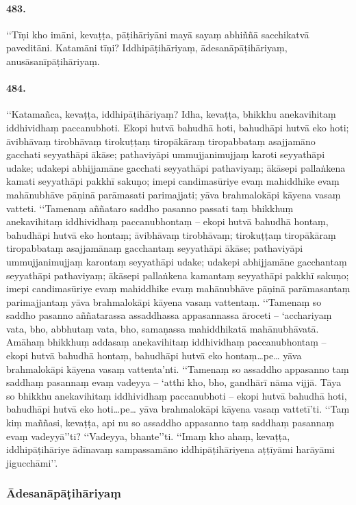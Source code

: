 \paragraph{483.} ‘‘Tīṇi kho imāni, kevaṭṭa, pāṭihāriyāni mayā sayaṃ abhiññā sacchikatvā paveditāni. Katamāni tīṇi? Iddhipāṭihāriyaṃ, ādesanāpāṭihāriyaṃ, anusāsanīpāṭihāriyaṃ.

\paragraph{484.} ‘‘Katamañca, kevaṭṭa, iddhipāṭihāriyaṃ? Idha, kevaṭṭa, bhikkhu anekavihitaṃ iddhividhaṃ paccanubhoti. Ekopi hutvā bahudhā hoti, bahudhāpi hutvā eko hoti; āvibhāvaṃ tirobhāvaṃ tirokuṭṭaṃ tiropākāraṃ tiropabbataṃ asajjamāno gacchati seyyathāpi ākāse; pathaviyāpi ummujjanimujjaṃ karoti seyyathāpi udake; udakepi abhijjamāne gacchati seyyathāpi pathaviyaṃ; ākāsepi pallaṅkena kamati seyyathāpi pakkhī sakuṇo; imepi candimasūriye evaṃ mahiddhike evaṃ mahānubhāve pāṇinā parāmasati parimajjati; yāva brahmalokāpi kāyena vasaṃ vatteti. ‘‘Tamenaṃ aññataro saddho pasanno passati taṃ bhikkhuṃ anekavihitaṃ iddhividhaṃ paccanubhontaṃ – ekopi hutvā bahudhā hontaṃ, bahudhāpi hutvā eko hontaṃ; āvibhāvaṃ tirobhāvaṃ; tirokuṭṭaṃ tiropākāraṃ tiropabbataṃ asajjamānaṃ gacchantaṃ seyyathāpi ākāse; pathaviyāpi ummujjanimujjaṃ karontaṃ seyyathāpi udake; udakepi abhijjamāne gacchantaṃ seyyathāpi pathaviyaṃ; ākāsepi pallaṅkena kamantaṃ seyyathāpi pakkhī sakuṇo; imepi candimasūriye evaṃ mahiddhike evaṃ mahānubhāve pāṇinā parāmasantaṃ parimajjantaṃ yāva brahmalokāpi kāyena vasaṃ vattentaṃ. ‘‘Tamenaṃ so saddho pasanno aññatarassa assaddhassa appasannassa āroceti – ‘acchariyaṃ vata, bho, abbhutaṃ vata, bho, samaṇassa mahiddhikatā mahānubhāvatā. Amāhaṃ bhikkhuṃ addasaṃ anekavihitaṃ iddhividhaṃ paccanubhontaṃ – ekopi hutvā bahudhā hontaṃ, bahudhāpi hutvā eko hontaṃ…pe… yāva brahmalokāpi kāyena vasaṃ vattenta’nti. ‘‘Tamenaṃ so assaddho appasanno taṃ saddhaṃ pasannaṃ evaṃ vadeyya – ‘atthi kho, bho, gandhārī nāma vijjā. Tāya so bhikkhu anekavihitaṃ iddhividhaṃ paccanubhoti – ekopi hutvā bahudhā hoti, bahudhāpi hutvā eko hoti…pe… yāva brahmalokāpi kāyena vasaṃ vattetī’ti. ‘‘Taṃ kiṃ maññasi, kevaṭṭa, api nu so assaddho appasanno taṃ saddhaṃ pasannaṃ evaṃ vadeyyā’’ti? ‘‘Vadeyya, bhante’’ti. ‘‘Imaṃ kho ahaṃ, kevaṭṭa, iddhipāṭihāriye ādīnavaṃ sampassamāno iddhipāṭihāriyena aṭṭīyāmi harāyāmi jigucchāmi’’.

\subsubsection{Ādesanāpāṭihāriyaṃ}

